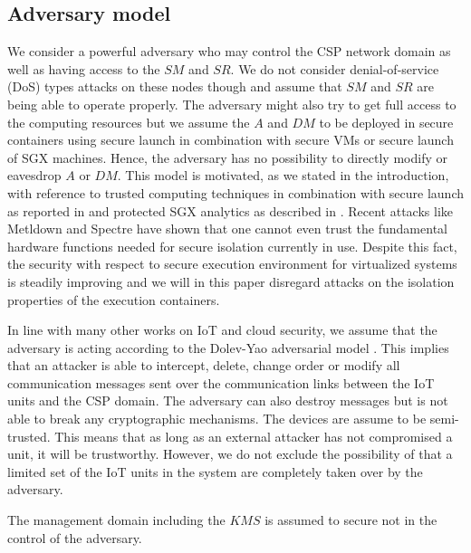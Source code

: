 {\subsection{Adversary model}
\label{requirements:adversary}
We consider a powerful adversary who may control the CSP network domain as well as having access to the $SM$ and $SR$. We do not consider denial-of-service (DoS) types attacks on these nodes though and assume that $SM$ and $SR$ are being able to operate properly. The adversary might also try to get full access to the computing resources but we assume the $A$ and  $DM$ to be deployed in secure containers using secure launch in combination with secure VMs or secure launch of SGX machines. Hence, the adversary has no possibility to directly modify or eavesdrop $A$ or $DM$. This model is motivated, as we stated in the introduction, with reference to trusted computing techniques in combination with secure launch as reported in \cite{Paladi2017} and protected SGX analytics as described in \cite{Schuster2015}. Recent attacks like Metldown \cite{Lipp2018} and Spectre \cite{Kocher2019}  have shown that one cannot even trust the fundamental hardware functions needed for secure isolation currently in use. Despite this fact, the security with respect to secure execution environment for virtualized systems is steadily improving and we will in this paper disregard attacks on the isolation properties of the execution containers. 

In line with many other works on IoT and cloud security, we assume that the adversary is acting according to the Dolev-Yao adversarial model \cite{ Dolev1981}. This implies that an attacker is able to intercept, delete, change order or modify all communication messages sent over the communication links between the IoT units and the CSP domain. The adversary can also destroy messages but is not able to break any cryptographic mechanisms. The devices are assume to be semi-trusted. This means that as long as an external attacker has not compromised a unit, it will be trustworthy. However, we do not exclude the possibility of that a limited set of the IoT units in the system are completely taken over by the adversary. 

The management domain including the $KMS$ is assumed to secure not in the control of the adversary.

}
